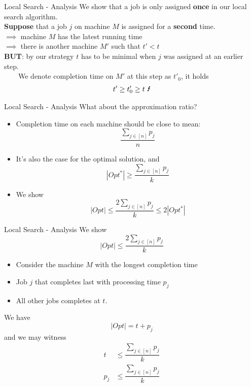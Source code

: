 \documentclass{beamer}
\newcommand*{\brk}{\\[10pt]}
\begin{document}
\begin{frame}{Local Search - Analysis}
    We show that a job is only assigned \textbf{once} in our local search algorithm. \brk 
    \textbf{Suppose} that a job $j$ on machine $M$ is assigned for a \textbf{second} time. \brk \pause
    $\implies$ machine $M$ has the latest running time \brk \pause
    $\implies$ there is another machine $M'$ such that $t' < t$ \brk \pause 
    \textbf{BUT}: by our strategy $t$ has to be minimal when $j$ was assigned at an earlier step. \brk \pause 
    \ \ \ \ We denote completion time on $M'$ at this step as $t'_0$, it holds 
    \begin{align*}
        t' \geq t'_0 \geq t \ \mbox{\Lightning}
    \end{align*}  
\end{frame}

\begin{frame}{Local Search - Analysis}
    What about the approximation ratio? \brk \pause 
    \begin{itemize}
        \item Completion time on each machine should be close to mean: $$\dfrac{\sum_{j \in [n]}p_j}{n}$$
        \item It's also the case for the optimal solution, and $$|Opt^*| \geq \dfrac{\sum_{j \in [n]}p_j}{k}$$
        \item We show $$|Opt| \leq \dfrac{2\sum_{j \in [n]}p_j}{k} \leq 2|Opt^*|$$
    \end{itemize}
\end{frame}

\begin{frame}{Local Search - Analysis}
    We show $$|Opt| \leq \dfrac{2\sum_{j \in [n]}p_j}{k}$$ 
    \begin{itemize}
        \item Consider the machine $M$ with the longest completion time 
        \item Job $j$ that completes last with processing time $p_j$ 
        \item All other jobs completes at $t$.
    \end{itemize}
    We have $$|Opt| = t + p_j$$ and we may witness 
    \begin{align*}
        t &\leq  \dfrac{\sum_{j \in [n]}p_j}{k} \\ 
        p_j &\leq  \dfrac{\sum_{j \in [n]}p_j}{k}
    \end{align*}
\end{frame}
\end{document}
